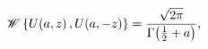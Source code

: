\[\mathop{\mathscr{W}\/}\nolimits\left\{\mathop{U\/}\nolimits\!\left(a,z\right),%
\mathop{U\/}\nolimits\!\left(a,-z\right)\right\}=\frac{\sqrt{2\pi}}{\mathop{%
\Gamma\/}\nolimits\!\left(\frac{1}{2}+a\right)},\]